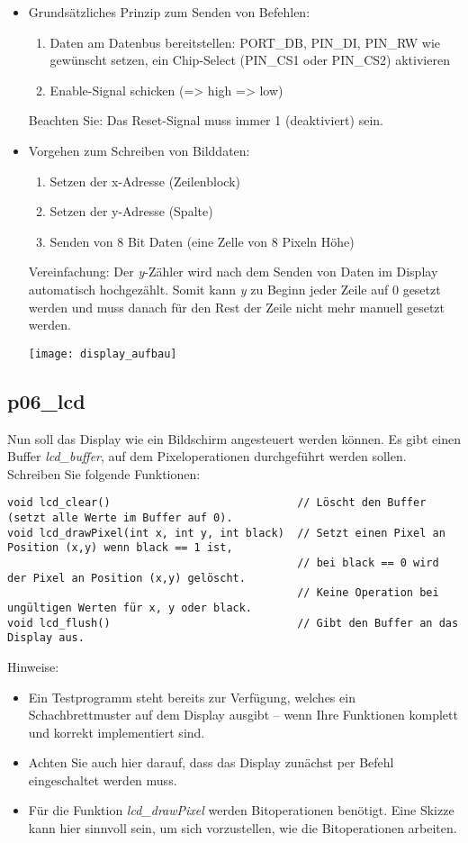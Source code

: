 \documentclass[
  accentcolor=tud1c,	%
  colorbacktitle,		%
  inverttitle,			%
  german,				%
  twoside
]{tudexercise}
\begin{document}
\begin{itemize}
\item Grundsätzliches Prinzip zum Senden von Befehlen:\begin{enumerate}
\item Daten am Datenbus bereitstellen: PORT\_DB, PIN\_DI, PIN\_RW wie gewünscht setzen, ein Chip-Select (PIN\_CS1 oder PIN\_CS2) aktivieren
\item Enable-Signal schicken (=> high => low)
\end{enumerate}
Beachten Sie: Das Reset-Signal muss immer 1 (deaktiviert) sein.

\item Vorgehen zum Schreiben von Bilddaten:\begin{enumerate}
\item Setzen der x-Adresse (Zeilenblock)
\item Setzen der y-Adresse (Spalte)
\item Senden von 8 Bit Daten (eine \glqq{}Zelle\grqq{} von 8 Pixeln Höhe)
\end{enumerate}
Vereinfachung: Der \textit{y}-Zähler wird nach dem Senden von Daten im Display automatisch hochgezählt. Somit kann \textit{y} zu Beginn jeder Zeile auf 0 gesetzt werden und muss danach für den Rest der Zeile nicht mehr manuell gesetzt werden.

\begin{center}\texttt{[image: display\_aufbau]}\end{center}


\end{itemize}

\subsection{p06\_lcd}
Nun soll das Display wie ein Bildschirm angesteuert werden können. Es gibt einen Buffer \textit{lcd\_buffer}, auf dem Pixeloperationen durchgeführt werden sollen. Schreiben Sie folgende Funktionen:
\begin{lstlisting}
void lcd_clear()                             // Löscht den Buffer (setzt alle Werte im Buffer auf 0).
void lcd_drawPixel(int x, int y, int black)  // Setzt einen Pixel an Position (x,y) wenn black == 1 ist,
                                             // bei black == 0 wird der Pixel an Position (x,y) gelöscht.
                                             // Keine Operation bei ungültigen Werten für x, y oder black.
void lcd_flush()                             // Gibt den Buffer an das Display aus.
\end{lstlisting}
Hinweise:
\begin{itemize}
\item Ein Testprogramm steht bereits zur Verfügung, welches ein Schachbrettmuster auf dem Display ausgibt -- wenn Ihre Funktionen komplett und korrekt implementiert sind.
\item Achten Sie auch hier darauf, dass das Display zunächst per Befehl eingeschaltet werden muss.
\item Für die Funktion \textit{lcd\_drawPixel} werden Bitoperationen benötigt. Eine Skizze kann hier sinnvoll sein, um sich vorzustellen, wie die Bitoperationen arbeiten.
\end{itemize}
\end{document}
